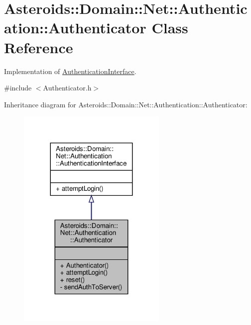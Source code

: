 \hypertarget{classAsteroids_1_1Domain_1_1Net_1_1Authentication_1_1Authenticator}{}\section{Asteroids\+:\+:Domain\+:\+:Net\+:\+:Authentication\+:\+:Authenticator Class Reference}
\label{classAsteroids_1_1Domain_1_1Net_1_1Authentication_1_1Authenticator}


Implementation of \hyperlink{classAsteroids_1_1Domain_1_1Net_1_1Authentication_1_1AuthenticationInterface}{Authentication\+Interface}.  




{\ttfamily \#include $<$Authenticator.\+h$>$}



Inheritance diagram for Asteroids\+:\+:Domain\+:\+:Net\+:\+:Authentication\+:\+:Authenticator\+:\nopagebreak
\begin{figure}[H]
\begin{center}
\leavevmode
\includegraphics[width=203pt]{classAsteroids_1_1Domain_1_1Net_1_1Authentication_1_1Authenticator__inherit__graph}
\end{center}
\end{figure}


